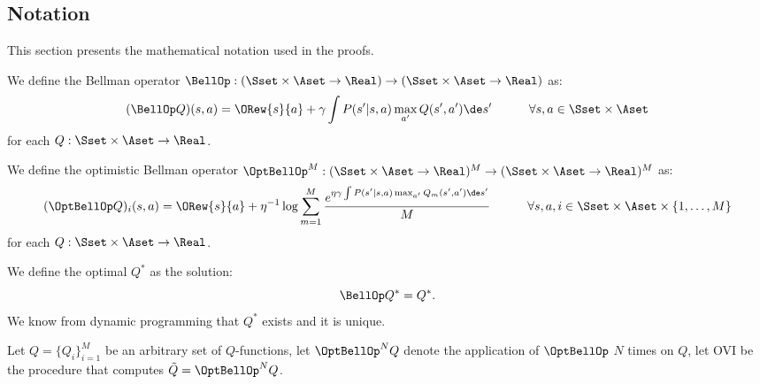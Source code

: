 \subsection{Notation}
This section presents the mathematical notation used in the proofs.
\begin{definition}
	We define the Bellman operator $\BellOp:(\Sset \times \Aset \to \Real)\to(\Sset \times \Aset \to \Real)$ as:
	\begin{equation}
	(\BellOp Q)(s,a) = \ORew{s}{a} +\gamma \int P(s'|s,a) \max_{a'} Q(s',a')\de s' \quad \quad \quad \forall s, a \in \Sset \times \Aset \nonumber
	\end{equation}
	for each $Q:\Sset \times \Aset \to \Real$.
	\label{def:bellman_operator}
\end{definition}
\begin{definition}
	We define the optimistic Bellman operator $\OptBellOp^M:(\Sset \times \Aset \to \Real)^M \to(\Sset \times \Aset \to \Real)^M $ as:
	\begin{equation}
	(\OptBellOp Q)_i(s,a) = \ORew{s}{a} +\eta^{-1}\log \sum_{m=1}^M\frac{ e^{\eta \gamma \int P(s'|s,a) \max_{a'} Q_m(s',a')\de s'}}{M} \quad \quad \quad \forall s, a, i \in \Sset \times \Aset \times \{1,\dots,M\} \nonumber
	\end{equation}
	for each $Q:\Sset \times \Aset \to \Real$.
	\label{def:optimistic_bellman_operator}
\end{definition}
\begin{definition}[Optimal $Q$]
	We define the optimal $Q^*$ as the solution:
	\begin{equation}
	\BellOp Q^* = Q^* \nonumber.
	\end{equation}
	We know from dynamic programming that $Q^*$ exists and it is unique.
	\label{def:optsol}
\end{definition}
\begin{definition}
	Let $Q = \{Q_i \}_{i=1}^{M}$ be an arbitrary set of $Q$-functions, let $\OptBellOp^NQ$ denote the application of $\OptBellOp$ $N$ times on $Q$, let OVI be the procedure that computes $\tilde{Q} = \OptBellOp^N Q$.
	\label{def:ovi}
\end{definition}
